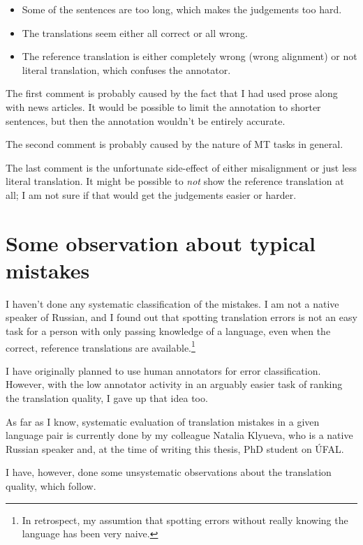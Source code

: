 \begin{itemize}
\item Some of the sentences are too long, which makes the judgements too hard.
\item The translations seem either all correct or all wrong.
\item The reference translation is either completely wrong (wrong alignment) or not literal translation, which confuses the annotator.
\end{itemize}

The first comment is probably caused by the fact that I had used prose along with news articles. It would be possible to limit the annotation to shorter sentences, but then the annotation wouldn't be entirely accurate.

The second comment is probably caused by the nature of MT tasks in general.

The last comment is the unfortunate side-effect of either misalignment or just less literal translation. It might be possible to \emph{not} show the reference translation at all; I am not sure if that would get the judgements easier or harder.

\section{Some observation about typical mistakes}
I haven't done any systematic classification of the mistakes. I am not a native speaker of Russian, and I found out that spotting translation errors is not an easy task for a person with only passing knowledge of a language, even when the correct, reference translations are available.\footnote{In retrospect, my assumtion that spotting errors without really knowing the language has been very naive.}

I have originally planned to use human annotators for error classification. However, with the low annotator activity in an arguably easier task of ranking the translation quality, I gave up that idea too.

As far as I know, systematic evaluation of translation mistakes in a given language pair is currently done by my colleague Natalia Klyueva, who is a native Russian speaker and, at the time of writing this thesis, PhD student on ÚFAL.

I have, however, done some unsystematic observations about the translation quality, which follow. 


